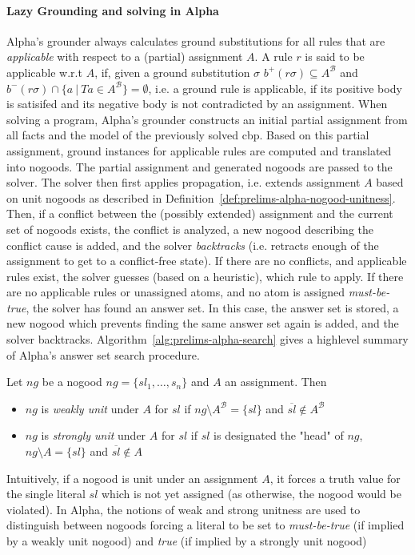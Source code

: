\paragraph{Lazy Grounding and solving in Alpha~\cite{alpha-techniques}}
Alpha's grounder always calculates ground substitutions for all rules that are \emph{applicable} with respect to a (partial) assignment $A$. A rule $r$ is said to be applicable w.r.t $A$, if, given a ground substitution $\sigma$ $b^{+}(r\sigma) \subseteq A^{\mathcal{B}}$ and $b^{-}(r\sigma) \cap \{a~|~Ta \in A^{\mathcal{B}}\} = \emptyset$, i.e. a ground rule is applicable, if its positive body is satisifed and its negative body is not contradicted by an assignment.
When solving a program, Alpha's grounder constructs an initial partial assignment from all facts and the model of the previously solved \gls{cbp}. Based on this partial assignment, ground instances for applicable rules are computed and translated into nogoods. The partial assignment and generated nogoods are passed to the solver. The solver then first applies propagation, i.e. extends assignment $A$ based on unit nogoods as described in Definition~\ref{def:prelims-alpha-nogood-unitness}. Then, if a conflict between the (possibly extended) assignment and the current set of nogoods exists, the conflict is analyzed, a new nogood describing the conflict cause is added, and the solver \emph{backtracks} (i.e. retracts enough of the assignment to get to a conflict-free state). If there are no conflicts, and applicable rules exist, the solver guesses (based on a heuristic), which rule to apply. If there are no applicable rules or unassigned atoms, and no atom is assigned \emph{must-be-true}, the solver has found an answer set. In this case, the answer set is stored, a new nogood which prevents finding the same answer set again is added, and the solver backtracks. Algorithm~\ref{alg:prelims-alpha-search} gives a highlevel summary of Alpha's answer set search procedure.

\begin{definition}
\label{def:prelims-alpha-nogood-unitness}	
Let $ng$ be a nogood $ng = \{sl_1,\ldots,s_n\}$ and $A$ an assignment. Then
\begin{itemize}
	\item $ng$ is \emph{weakly unit} under $A$ for $sl$ if $ng \setminus A^{\mathcal{B}} = \{sl\}$ and $\overline{sl} \notin A^{\mathcal{B}}$
	\item $ng$ is \emph{strongly unit} under $A$ for $sl$ if $sl$ is designated the "head" of $ng$, $ng \setminus A = \{sl\}$ and $\overline{sl} \notin A$
\end{itemize}	
Intuitively, if a nogood is unit under an assignment $A$, it forces a truth value for the single literal $sl$ which is not yet assigned (as otherwise, the nogood would be violated). In Alpha, the notions of weak and strong unitness are used to distinguish between nogoods forcing a literal to be set to \emph{must-be-true} (if implied by a weakly unit nogood) and \emph{true} (if implied by a strongly unit nogood)
\end{definition}	

